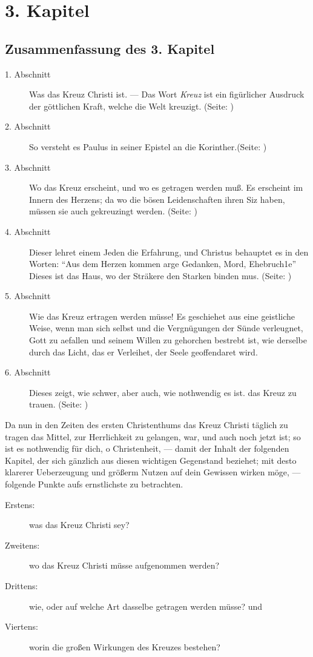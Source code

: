 
\chapter{3. Kapitel} \label{kap3}

\section{Zusammenfassung des 3. Kapitel}

\footnotesize
\begin{description}
\item[1. Abschnitt] Was das Kreuz Christi ist. — Das Wort \textit{Kreuz} ist ein
figürlicher Ausdruck der göttlichen Kraft, welche die Welt kreuzigt.
(Seite: \pageref{kap3_ab1})
\item[2. Abschnitt] So versteht es Paulus in seiner Epistel an die
Korinther.(Seite: \pageref{kap3_ab2})
\item[3. Abschnitt] Wo das Kreuz erscheint, und wo es getragen werden muß. Es
erscheint im Innern des Herzens; da wo die bösen Leidenschaften ihren Siz haben,
müssen sie auch gekreuzingt werden. (Seite: \pageref{kap3_ab3})
\item[4. Abschnitt] Dieser lehret einem Jeden die Erfahrung, und Christus
behauptet es in den Worten: "`Aus dem Herzen kommen arge Gedanken, Mord,
Ehebruch1e"' Dieses ist das Haus, wo der Sträkere den Starken binden mus.
(Seite: \pageref{kap3_ab4})
\item[5. Abschnitt] Wie das Kreuz ertragen werden müsse! Es geschiehet aus eine
geistliche Weise, wenn man sich selbst und die Vergnügungen der Sünde
verleugnet, Gott zu aefallen und seinem Willen zu gehorchen bestrebt ist, wie
derselbe durch das Licht, das er Verleihet, der Seele geoffendaret wird.
\item[6. Abschnitt] Dieses zeigt, wie schwer, aber auch, wie nothwendig es ist.
das Kreuz zu trauen. (Seite: \pageref{kap3_ab5})
\end{description}
\normalsize

Da nun in den Zeiten des ersten Christenthums das Kreuz Christi täglich zu
tragen das Mittel, zur Herrlichkeit zu gelangen, war, und auch noch jetzt ist;
so ist es nothwendig für dich, o Christenheit, — damit der Inhalt der folgenden
Kapitel, der sich gänzlich aus diesen wichtigen Gegenstand beziehet; mit desto
klarerer Ueberzeugung und größerm Nutzen auf dein Gewissen wirken möge, —
folgende Punkte aufs ernstlichste zu betrachten.
\begin{description}
\item[Erstens:] was das Kreuz Christi sey?
\item[Zweitens:] wo das Kreuz Christi müsse aufgenommen werden?
\item[Drittens:] wie, oder auf welche Art dasselbe getragen werden müsse? und
\item[Viertens:] worin die großen Wirkungen des Kreuzes bestehen?
\end{description}

